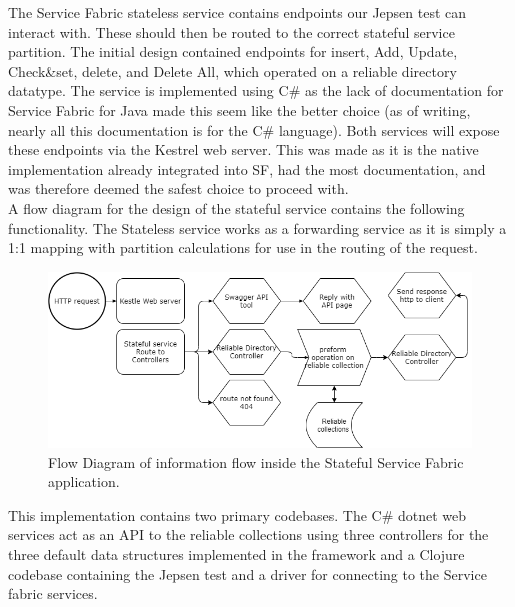\documentclass[a4paper,10pt,titlepage]{report}
\begin{document}
    The Service Fabric stateless service contains endpoints our Jepsen test can interact with. These should then be routed to the correct stateful service partition. The initial design contained endpoints for insert, Add, Update, Check\&set, delete, and Delete All, which operated on a reliable directory datatype. The service is implemented using C\# as the lack of documentation for Service Fabric for Java made this seem like the better choice (as of writing, nearly all this documentation is for the C\# language). Both services will expose these endpoints via the Kestrel web server. This was made as it is the native implementation already integrated into SF, had the most documentation, and was therefore deemed the safest choice to proceed with.\\
    \vspace{5mm}
    A flow diagram for the design of the stateful service contains the following functionality. The Stateless service works as a forwarding service as it is simply a 1:1 mapping with partition calculations for use in the routing of the request. \\
    \vspace{5mm}
    \begin{figure}[h!]
        \centering
            \includegraphics[scale=0.5]{images/Design_Stateful_service_1.0.drawio.png}
        \caption{Flow Diagram of information flow inside the Stateful Service Fabric application.}
    \end{figure}



    This implementation contains two primary codebases. The C\# dotnet web services act as an API to the reliable collections using three controllers for the three default data structures implemented in the framework and a Clojure codebase containing the Jepsen test and a driver for connecting to the Service fabric services.
\end{document}
